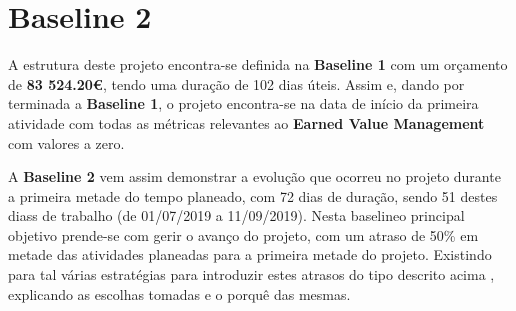 \section{Baseline 2}

A estrutura deste projeto encontra-se definida na \textbf{Baseline 1} com um orçamento de \textbf{83 524.20\euro}, tendo uma duração de 102 dias úteis. Assim e, dando por terminada a \textbf{Baseline 1}, o projeto encontra-se na data de início da primeira atividade com todas as métricas relevantes ao \textbf{Earned Value Management} com valores a zero.

A \textbf{Baseline 2} vem assim demonstrar a evolução que ocorreu no projeto durante a primeira metade do tempo planeado, com 72 dias de duração, sendo 51 destes diass de trabalho (de 01/07/2019 a 11/09/2019). Nesta baselineo principal objetivo prende-se com gerir o avanço do projeto, com um atraso de 50\% em metade das atividades planeadas para a primeira metade do projeto. Existindo para tal várias estratégias para introduzir estes atrasos do tipo descrito acima , explicando as escolhas tomadas e o porquê das mesmas.


